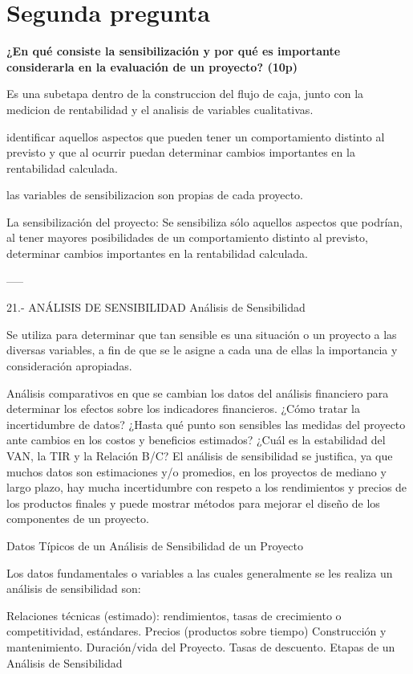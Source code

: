 \section{Segunda pregunta}

{\bf ¿En qué consiste la sensibilización y por qué es importante considerarla en la evaluación de un proyecto? (10p)}



Es una subetapa dentro de la construccion del flujo de caja,
junto con la medicion de rentabilidad y el analisis de variables cualitativas.


identificar aquellos aspectos que pueden tener un comportamiento distinto al previsto
y que al ocurrir puedan determinar cambios importantes en la rentabilidad calculada.

las variables de sensibilizacion son propias de cada proyecto.


La sensibilización del proyecto: Se sensibiliza sólo aquellos aspectos que podrían, al tener mayores posibilidades de un comportamiento distinto al previsto, determinar cambios importantes en la rentabilidad calculada.


-----

21.- ANÁLISIS DE SENSIBILIDAD
Análisis de Sensibilidad

Se utiliza para determinar que tan sensible es una situación o un proyecto a las diversas variables, a fin de que se le asigne a cada una de ellas la importancia y consideración apropiadas.

Análisis comparativos en que se cambian los datos del análisis financiero para determinar los efectos sobre los indicadores financieros.
¿Cómo tratar la incertidumbre de datos?
¿Hasta qué punto son sensibles las medidas del proyecto ante cambios en los costos y beneficios estimados?
¿Cuál es la estabilidad del VAN, la TIR y la Relación B/C?
El análisis de sensibilidad se justifica, ya que muchos datos son estimaciones y/o promedios, en los proyectos de mediano y largo plazo, hay mucha incertidumbre con respeto a los rendimientos y precios de los productos finales y puede mostrar métodos para mejorar el diseño de los componentes de un proyecto.

Datos Típicos de un Análisis de Sensibilidad de un Proyecto

Los datos fundamentales o variables a las cuales generalmente se les realiza un análisis de sensibilidad son:

Relaciones técnicas (estimado): rendimientos, tasas de crecimiento o competitividad, estándares.
Precios (productos sobre tiempo)
Construcción y mantenimiento.
Duración/vida del Proyecto.
Tasas de descuento.
Etapas de un Análisis de Sensibilidad

